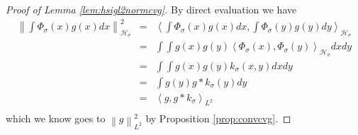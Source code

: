 \documentclass{article} %
\def\hsig{{\mathcal{H}_\sigma}}
\def\ksig{{k_\sigma}}
\def\fm{{\Phi_\sigma}} %
\def\l{\left}
\def\r{\right}
\theoremstyle{definition}
\begin{document}
\begin{proof}[Proof of Lemma \ref{lem:hsigl2normcvg}]
	By direct evaluation we have
	\begin{eqnarray*}
		\l\|\int \fm(x) g(x) dx \r\|_\hsig^2
		&=& \l< \int \fm(x) g(x) dx,\int \fm(y) g(y) dy\r>_\hsig\\
		&=& \int \int g(x) g(y) \l<  \fm(x) , \fm(y) \r>_\hsig dx dy\\
		&=& \int \int g(x) g(y) \ksig(x,y) dx dy\\
		&=&  \int g(y) g\ast \ksig (y) dy \\
		&=& \l< g, g\ast \ksig \r>_{L^2} \\
	\end{eqnarray*}
	which we know goes to $\l\|g\r\|_{L^2}^2$ by Proposition \ref{prop:convcvg}.
\end{proof}
\end{document}
